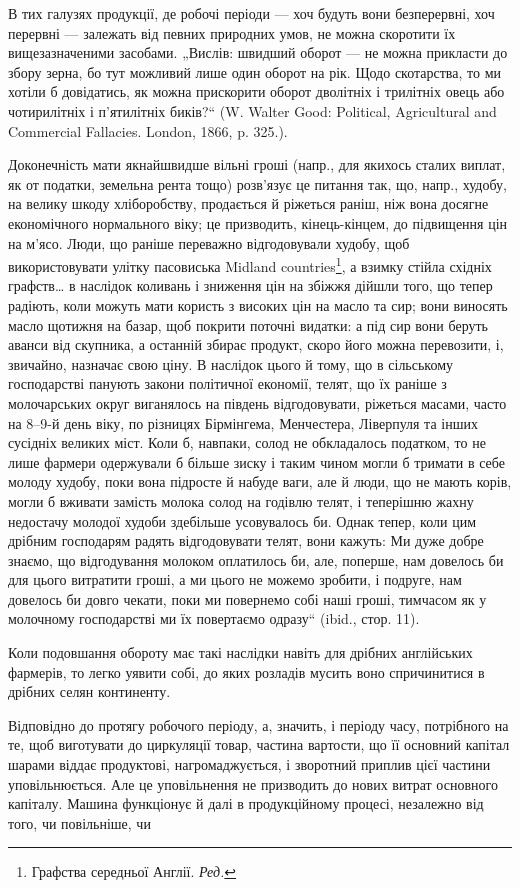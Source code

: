 
В тих галузях продукції, де робочі періоди — хоч будуть вони безперервні,
хоч перервні — залежать від певних природних умов, не можна
скоротити їх вищезазначеними засобами. „Вислів: швидший оборот — не
можна прикласти до збору зерна, бо тут можливий лише один оборот
на рік. Щодо скотарства, то ми хотіли б довідатись, як можна прискорити
оборот дволітніх і трилітніх овець або чотирилітніх і п’ятилітніх
биків?“ (W. Walter Good: Political, Agricultural and Commercial Fallacies.
London, 1866, p. 325.).

Доконечність мати якнайшвидше вільні гроші (напр., для якихось сталих
виплат, як от податки, земельна рента тощо) розв’язує це питання
так, що, напр., худобу, на велику шкоду хліборобству, продається й
ріжеться раніш, ніж вона досягне економічного нормального віку; це
призводить, кінець-кінцем, до підвищення цін на м’ясо. Люди, що раніше
переважно відгодовували худобу, щоб використовувати улітку пасовиська
Midland countries\footnote*{
Графства середньої Англії. \emph{Ред.}
}, а взимку стійла східніх графств\dots{} в наслідок коливань
і зниження цін на збіжжя дійшли того, що тепер радіють, коли
можуть мати користь з високих цін на масло та сир; вони виносять масло
щотижня на базар, щоб покрити поточні видатки: а під сир вони беруть
аванси від скупника, а останній збирає продукт, скоро його можна перевозити,
і, звичайно, назначає свою ціну. В наслідок цього й тому, що
в сільському господарстві панують закони політичної економії, телят, що
їх раніше з молочарських округ виганялось на південь відгодовувати,
ріжеться масами, часто на 8--9-й день віку, по різницях Бірмінгема, Менчестера,
Ліверпуля та інших сусідніх великих міст. Коли б, навпаки,
солод не обкладалось податком, то не лише фармери одержували б більше
зиску і таким чином могли б тримати в себе молоду худобу, поки вона
підросте й набуде ваги, але й люди, що не мають корів, могли б вживати
замість молока солод на годівлю телят, і теперішню жахну недостачу
молодої худоби здебільше усовувалось би. Однак тепер, коли цим
дрібним господарям радять відгодовувати телят, вони кажуть: Ми дуже
добре знаємо, що відгодування молоком оплатилось би, але, поперше,
нам довелось би для цього витратити гроші, а ми цього не можемо зробити,
і подруге, нам довелось би довго чекати, поки ми повернемо собі
наші гроші, тимчасом як у молочному господарстві ми їх повертаємо
одразу“ (ibid., стор. 11).

Коли подовшання обороту має такі наслідки навіть для дрібних англійських
фармерів, то легко уявити собі, до яких розладів мусить воно
спричинитися в дрібних селян континенту.

Відповідно до протягу робочого періоду, а, значить, і періоду часу,
потрібного на те, щоб виготувати до циркуляції товар, частина вартости,
що її основний капітал шарами віддає продуктові, нагромаджується, і
зворотний приплив цієї частини уповільнюється. Але це уповільнення не
призводить до нових витрат основного капіталу. Машина функціонує й
далі в продукційному процесі, незалежно від того, чи повільніше, чи
\parbreak{}  %
